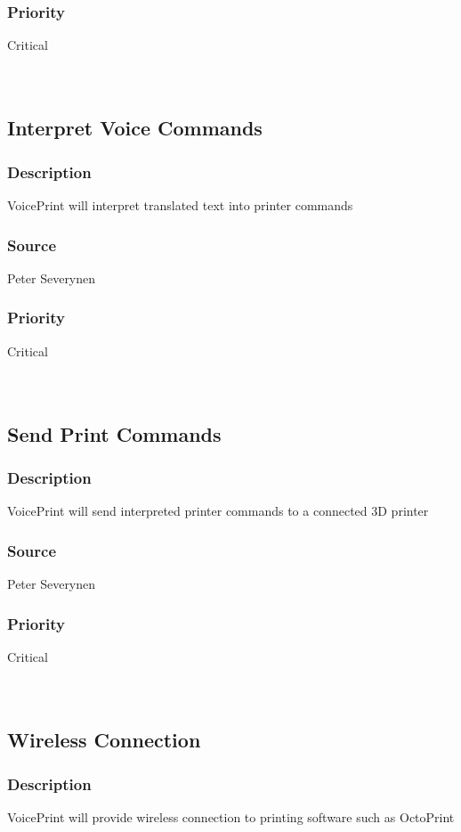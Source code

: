 \subsubsection{Priority}
Critical\\
\\
\\
\subsection{Interpret Voice Commands}
\subsubsection{Description}
VoicePrint will interpret translated text into printer commands
\subsubsection{Source}
Peter Severynen
\subsubsection{Priority}
Critical\\
\\
\\
\subsection{Send Print Commands}
\subsubsection{Description}
VoicePrint will send interpreted printer commands to a connected 3D printer
\subsubsection{Source}
Peter Severynen
\subsubsection{Priority}
Critical\\
\\
\\
\subsection{Wireless Connection}
\subsubsection{Description}
VoicePrint will provide wireless connection to printing software such as OctoPrint

